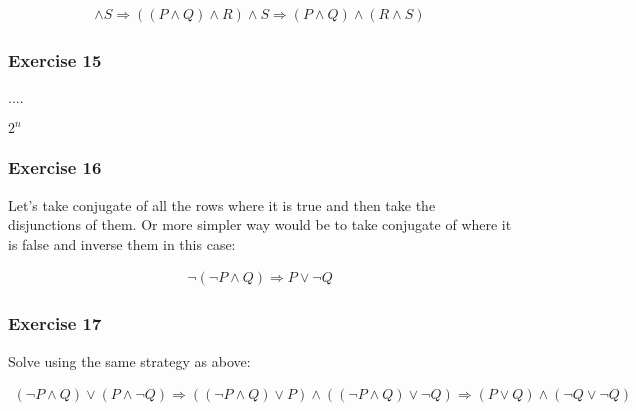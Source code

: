 \begin{solution}
    \begin{align*}
        [P \wedge (Q \wedge R)] \wedge S \Rightarrow ((P \wedge Q) \wedge R) \wedge S \Rightarrow (P \wedge Q) \wedge (R \wedge S)
    \end{align*}
\end{solution}


\subsubsection{Exercise 15}
\question ....
\begin{solution}
    $2^n$
\end{solution}

\subsubsection{Exercise 16}
\question Let's take conjugate of all the rows where it is true and then take the disjunctions of them. Or more simpler way would be to take conjugate of where it is false and inverse them in this case:

    \begin{solution}
        \begin{align*}
            \neg(\neg P \wedge Q) \Rightarrow P \vee \neg Q
        \end{align*}
    \end{solution}

\subsubsection{Exercise 17}

\question Solve using the same strategy as above:

\begin{solution}
    \begin{align*}
        (\neg P \wedge Q) \vee (P \wedge \neg Q) \Rightarrow ((\neg P \wedge Q) \vee P) \wedge (( \neg P \wedge Q) \vee \neg Q) \Rightarrow (P \vee Q) \wedge (\neg Q \vee \neg Q)
    \end{align*}
\end{solution}
    
